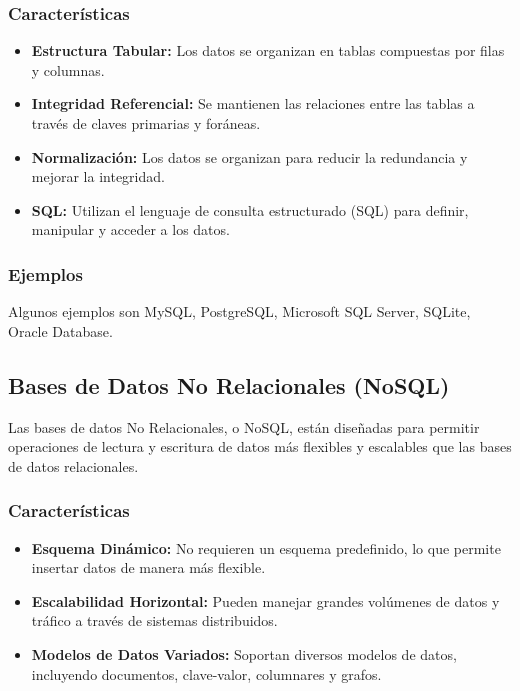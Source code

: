 \subsubsection{Características}
\begin{itemize}
\item \textbf{Estructura Tabular:} Los datos se organizan en tablas compuestas por filas y columnas.
\item \textbf{Integridad Referencial:} Se mantienen las relaciones entre las tablas a través de claves primarias y foráneas.
\item \textbf{Normalización:} Los datos se organizan para reducir la redundancia y mejorar la integridad.
\item \textbf{SQL:} Utilizan el lenguaje de consulta estructurado (SQL) para definir, manipular y acceder a los datos.
\end{itemize}

\subsubsection{Ejemplos}
Algunos ejemplos son MySQL, PostgreSQL, Microsoft SQL Server, SQLite, Oracle Database.

\subsection{Bases de Datos No Relacionales (NoSQL)}

Las bases de datos No Relacionales, o NoSQL, están diseñadas para permitir operaciones de lectura y escritura de datos más flexibles y escalables que las bases de datos relacionales.

\subsubsection{Características}
\begin{itemize}
\item \textbf{Esquema Dinámico:} No requieren un esquema predefinido, lo que permite insertar datos de manera más flexible.
\item \textbf{Escalabilidad Horizontal:} Pueden manejar grandes volúmenes de datos y tráfico a través de sistemas distribuidos.
\item \textbf{Modelos de Datos Variados:} Soportan diversos modelos de datos, incluyendo documentos, clave-valor, columnares y grafos.
\end{itemize}

